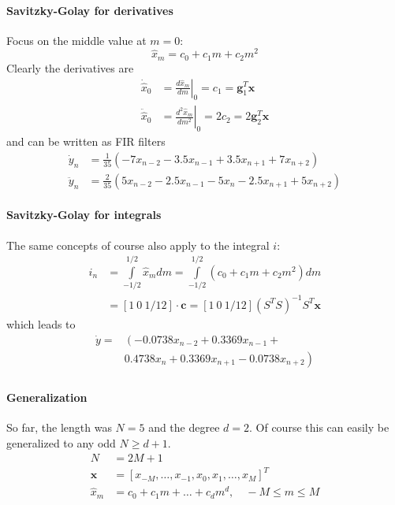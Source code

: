 \paragraph{Savitzky-Golay for derivatives}
Focus on the middle value at $m=0$:
\begin{equation*}
	\hat{x}_m = c_0 + c_1 m + c_2 m^2
\end{equation*}
Clearly the derivatives are
\begin{align*}
	\dot{\hat{x}}_0 &=  \left.\frac{d\hat{x}_m}{dm}\right|_0 = c_1 = \mathbf{g}_1^T\mathbf{x} \\
	\ddot{\hat{x}}_0 &= \left.\frac{d^2\hat{x}_m}{dm^2}\right|_0 = 2 c_2 = 2 \mathbf{g}_2^T\mathbf{x}
\end{align*}
and can be written as FIR filters
\begin{align*}
	\dot{y}_n &= \frac{1}{35} \left( -7 x_{n-2} - 3.5 x_{n-1} + 3.5 x_{n+1} + 7 x_{n+2}\right) \\
	\ddot{y}_n &= \frac{2}{35} \left( 5 x_{n-2} - 2.5 x_{n-1} - 5 x_n - 2.5 x_{n+1} + 5 x_{n+2}\right)
\end{align*}

\paragraph{Savitzky-Golay for integrals}
The same concepts of course also apply to  the integral $i$:
\begin{align*}
	i_n &= \int\limits_{-1/2}^{1/2} \hat{x}_m dm = \int\limits_{-1/2}^{1/2} (c_0 + c_1 m + c_2 m^2) dm \\
	&= \left[1 \: 0 \: 1/12 \right] \cdot \mathbf{c} = \left[1 \: 0 \: 1/12 \right] \left(S^T S \right)^{-1} S^T \mathbf{x}
\end{align*}
which leads to
\begin{align*}
	\dot{y} = & \left(-0.0738 x_{n-2} + 0.3369 x_{n-1} + \right. \\
	& \left. 0.4738 x_n + 0.3369 x_{n+1} - 0.0738 x_{n+2}  \right) \\
\end{align*}

\paragraph{Generalization}
So far, the length was $N=5$ and the degree $d=2$. Of course this can easily be
generalized to any odd $N \geq d+1$.
\begin{align*}
  N &= 2M + 1 \\
  \mathbf{x} &= [x_{-M},\ldots,x_{-1},x_0,x_1,\ldots,x_M]^T \\
  \hat{x}_m &= c_0 + c_1m + \ldots + c_dm^d, \quad -M \leq m \leq M
\end{align*}
